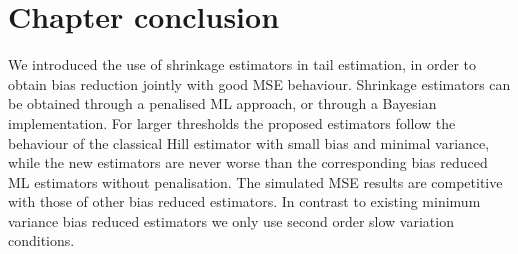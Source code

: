 \section{Chapter conclusion}
We introduced the use of shrinkage estimators in tail estimation, in order to obtain bias reduction jointly with good MSE behaviour. Shrinkage estimators can be obtained through a penalised ML approach, or through a Bayesian implementation. For larger thresholds the proposed estimators follow the behaviour of the classical Hill estimator with small bias and minimal variance, while the new estimators are never worse than the corresponding bias reduced ML estimators without penalisation. The simulated MSE results are competitive with those of other bias reduced estimators. In contrast to existing minimum variance bias reduced estimators we only use second order slow variation conditions.

